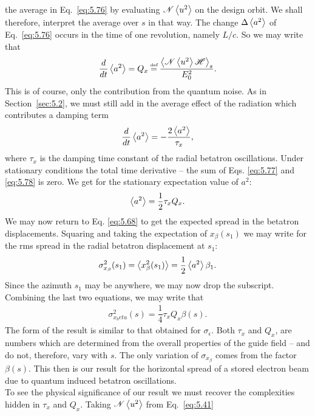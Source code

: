  the average in Eq.~\eqref{eq:5.76} by evaluating $\mathscr{N}\left< u^2 \right>$ on the design orbit. We shall therefore, interpret the average over $s$ in that way.
The change $\Delta \left< a^2 \right>$ of Eq.~\eqref{eq:5.76} occurs in the time of one revolution, namely $L/c$. So we may write that
\begin{align} \label{eq:5.77}
	\dfrac{d}{dt} \mean{a^2} = Q_x \bydef \dfrac{\mean{\mathscr{N}\mean{u^2}\mathscr{H}}_s}{E_0^2}.
\end{align}
This is of course, only the contribution from the quantum noise. As in Section~\ref{sec:5.2}, we must still add in the average effect of the radiation which contributes a damping term
\begin{align} \label{eq:5.78}
	\dfrac{d}{dt} \left< a^2 \right> = - \dfrac{2 \left< a^2 \right>}{\tau_x},
\end{align}
where $\tau_x$ is the damping time constant of the radial betatron oscillations. Under stationary
 conditions the total time derivative -- the sum of Eqs. \eqref{eq:5.77} and \eqref{eq:5.78} is zero. We get for the stationary expectation value of $a^2$:
\begin{align}
	\left< a^2 \right> = \dfrac{1}{2} \tau_x Q_x.
\end{align}
We may now return to Eq. \eqref{eq:5.68} to get the expected spread in the betatron displacements. Squaring and taking the expectation of $x_\beta(s_1)$ we may write for the rms spread in the radial betatron displacement at $s_1$:
\begin{align} \label{eq:5.81}
	\sigma_{x_\beta}^2(s_1) = \left< x_\beta^2(s_1) \right> = \dfrac{1}{2}\left< a^2 \right>\beta_1.
\end{align}
Since the azimuth $s_1$ may be anywhere, we may now drop the subscript. Combining the last two equations, we may write that
\begin{align}
	\sigma_{x_beta}^2(s) = \dfrac{1}{4} \tau_x Q_x \beta(s).
\end{align}
The form of the result is similar to that obtained for $\sigma_\epsilon$. Both $\tau_x$ and $Q_x$, are numbers which are determined from the overall properties of the guide field -- and do not, therefore, vary with $s$. The only variation of $\sigma_{x_\beta}$ comes from the factor $\beta(s)$. This then is our result for the horizontal spread of a stored electron beam due to quantum induced betatron oscillations.\\
To see the physical significance of our result we must recover the complexities hidden in $\tau_x$ and $Q_x$. Taking $\mathscr{N}\left< u^2 \right>$ from Eq.~\eqref{eq:5.41}
